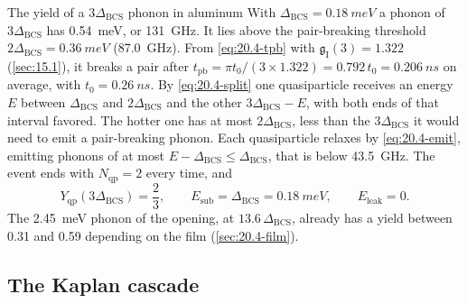 \begin{workedexample}{The yield of a $3\Delta_{\mathrm{BCS}}$ phonon in aluminum}\label{we:20-al3}
With $\Delta_{\mathrm{BCS}} = \SI{0.18}{meV}$ a phonon of $3\Delta_{\mathrm{BCS}}$ has \SI{0.54}{meV}, or \SI{131}{GHz}. It lies above the pair-breaking threshold $2\Delta_{\mathrm{BCS}} = \SI{0.36}{meV}$ (\SI{87.0}{GHz}). From \cref{eq:20.4-tpb} with $\mathfrak{g}_{\mathrm{I}}(3) = 1.322$ (\cref{sec:15.1}), it breaks a pair after $t_{\mathrm{pb}} = \pi t_0/(3 \times 1.322) = 0.792\,t_0 = \SI{0.206}{ns}$ on average, with $t_0 = \SI{0.26}{ns}$. By \cref{eq:20.4-split} one quasiparticle receives an energy $E$ between $\Delta_{\mathrm{BCS}}$ and $2\Delta_{\mathrm{BCS}}$ and the other $3\Delta_{\mathrm{BCS}} - E$, with both ends of that interval favored. The hotter one has at most $2\Delta_{\mathrm{BCS}}$, less than the $3\Delta_{\mathrm{BCS}}$ it would need to emit a pair-breaking phonon. Each quasiparticle relaxes by \cref{eq:20.4-emit}, emitting phonons of at most $E - \Delta_{\mathrm{BCS}} \le \Delta_{\mathrm{BCS}}$, that is below \SI{43.5}{GHz}. The event ends with $N_{\mathrm{qp}} = 2$ every time, and
\begin{equation*}
  Y_{\mathrm{qp}}(3\Delta_{\mathrm{BCS}}) = \frac{2}{3} , \qquad E_{\mathrm{sub}} = \Delta_{\mathrm{BCS}} = \SI{0.18}{meV} , \qquad E_{\mathrm{leak}} = 0 .
\end{equation*}
The \SI{2.45}{meV} phonon of the opening, at $13.6\,\Delta_{\mathrm{BCS}}$, already has a yield between 0.31 and 0.59 depending on the film (\cref{sec:20.4-film}).
\end{workedexample}

\subsection{The Kaplan cascade}\label{sec:20.4-cascade}

